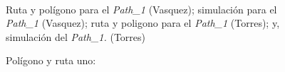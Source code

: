 \documentclass[]{report}
\begin{document}
\begin{figure}%
	
	\centering
		\hspace{8pt}%
	 \\
	\hspace{8pt}%
	\caption[A set of four subfigures.]{Polígono y ruta uno:}
		 Ruta y polígono para el \textit{Path\_1} (Vasquez);
		 simulación para el \textit{Path\_1} (Vasquez);
		 ruta y poligono para el \textit{Path\_1} (Torres); y,
		 simulación del \textit{Path\_1.} (Torres)%
	\label{path_1}%
\end{figure}
\end{document}
